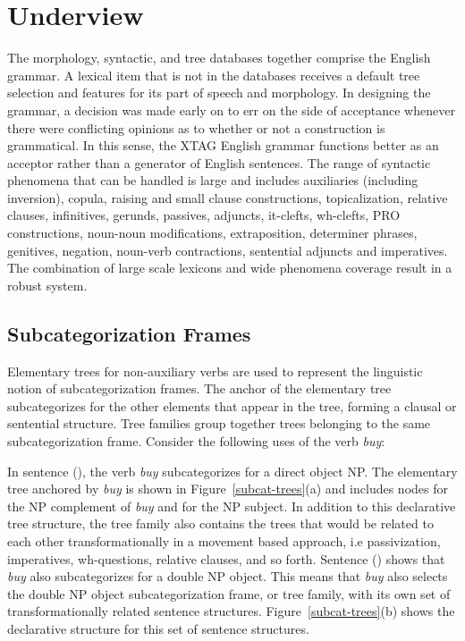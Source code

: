 \chapter{Underview}
\label{underview}

The morphology, syntactic, and tree databases together comprise the English
grammar.  A lexical item that is not in the databases receives a default tree
selection and features for its part of speech and morphology.  In designing the
grammar, a decision was made early on to err on the side of acceptance whenever
there were conflicting opinions as to whether or not a construction is
grammatical.  In this sense, the XTAG English grammar functions better as an
acceptor rather than a generator of English sentences.  The range of syntactic
phenomena that can be handled is large and includes auxiliaries (including
inversion), copula, raising and small clause constructions, topicalization,
relative clauses, infinitives, gerunds, passives, adjuncts, it-clefts,
wh-clefts, PRO constructions, noun-noun modifications, extraposition,
determiner phrases, genitives, negation, noun-verb contractions, sentential
adjuncts and imperatives.  The combination of large scale lexicons and wide
phenomena coverage result in a robust system.


\section{Subcategorization Frames}
\label{subcat-frames}

Elementary trees for non-auxiliary verbs are used to represent the linguistic
notion of subcategorization frames.  The anchor of the elementary tree
subcategorizes for the other elements that appear in the tree, forming a
clausal or sentential structure.  Tree families group together trees belonging
to the same subcategorization frame.  Consider the following uses of the verb
{\it buy}:


In sentence (), the verb {\it buy} subcategorizes for a direct object NP.
The elementary tree anchored by {\it buy} is shown in
Figure~\ref{subcat-trees}(a) and includes nodes for the NP complement of {\it
buy} and for the NP subject.  In addition to this declarative tree structure,
the tree family also contains the trees that would be related to each other
transformationally in a movement based approach, i.e passivization,
imperatives, wh-questions, relative clauses, and so forth.  Sentence ()
shows that {\it buy} also subcategorizes for a double NP object.  This means
that {\it buy} also selects the double NP object subcategorization frame, or
tree family, with its own set of transformationally related sentence
structures.  Figure~\ref{subcat-trees}(b) shows the declarative structure for
this set of sentence structures.

